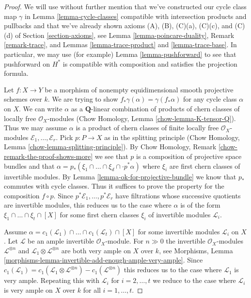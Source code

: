 \begin{proof}
We will use without further mention that we've constructed our
cycle class map $\gamma$ in Lemma \ref{lemma-cycle-classes}
compatible with intersection products and pullbacks and that
we've already shown axioms
(A), (B), (C)(a), (C)(c), and (C)(d) of Section \ref{section-axioms}, see
Lemma \ref{lemma-poincare-duality},
Remark \ref{remark-trace}, and
Lemmas \ref{lemma-trace-product} and \ref{lemma-trace-base}.
In particular, we may use (for example) Lemma \ref{lemma-pushforward}
to see that pushforward on $H^*$ is compatible with composition
and satisfies the projection formula.

\medskip\noindent
Let $f : X \to Y$ be a morphism of nonempty
equidimensional smooth projective schemes over $k$.
We are trying to show $f_*\gamma(\alpha) = \gamma(f_*\alpha)$
for any cycle class $\alpha$ on $X$.
We can write $\alpha$ as a $\mathbf{Q}$-linear combination of products of
chern classes of locally free $\mathcal{O}_X$-modules
(Chow Homology, Lemma \ref{chow-lemma-K-tensor-Q}).
Thus we may assume $\alpha$ is a product of chern classes of
finite locally free $\mathcal{O}_X$-modules
$\mathcal{E}_1, \ldots, \mathcal{E}_r$.
Pick $p : P \to X$ as in the splitting principle
(Chow Homology, Lemma \ref{chow-lemma-splitting-principle}).
By Chow Homology, Remark \ref{chow-remark-the-proof-shows-more}
we see that $p$ is a composition of projective space bundles and
that $\alpha = p_*(\xi_1 \cap \ldots \cap \xi_d \cap \cdot p^*\alpha)$
where $\xi_i$ are first chern classes of invertible modules.
By Lemma \ref{lemma-ok-for-projective-bundle}
we know that $p_*$ commutes with cycle classes.
Thus it suffices to prove the property for the composition
$f \circ p$. Since $p^*\mathcal{E}_1, \ldots, p^*\mathcal{E}_r$
have filtrations whose successive quotients are invertible
modules, this reduces us to the case where $\alpha$ is
of the form $\xi_1 \cap \ldots \cap \xi_t \cap [X]$
for some first chern classes $\xi_i$ of invertible modules $\mathcal{L}_i$.

\medskip\noindent
Assume
$\alpha = c_1(\mathcal{L}_1) \cap \ldots \cap c_1(\mathcal{L}_t) \cap [X]$
for some invertible modules $\mathcal{L}_i$ on $X$.
Let $\mathcal{L}$ be an ample invertible $\mathcal{O}_X$-module.
For $n \gg 0$ the invertible $\mathcal{O}_X$-modules
$\mathcal{L}^{\otimes n}$ and
$\mathcal{L}_1 \otimes \mathcal{L}^{\otimes n}$ are both
very ample on $X$ over $k$, see
Morphisms, Lemma \ref{morphisms-lemma-invertible-add-enough-ample-very-ample}.
Since $c_1(\mathcal{L}_1) = c_1(\mathcal{L}_1 \otimes \mathcal{L}^{\otimes n})
- c_1(\mathcal{L}^{\otimes n})$ this reduces us to the case where
$\mathcal{L}_1$ is very ample. Repeating this with $\mathcal{L}_i$
for $i = 2, \ldots, t$ we reduce to the case where $\mathcal{L}_i$
is very ample on $X$ over $k$ for all $i = 1, \ldots, t$.


\end{proof}
